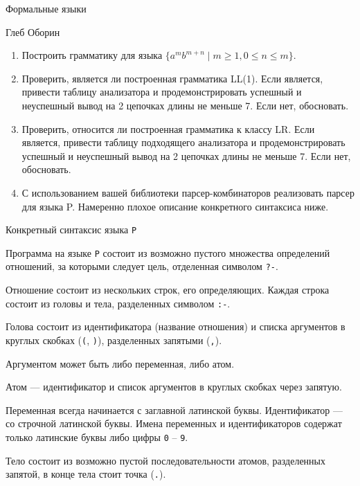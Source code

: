 \documentclass[12pt]{article}
\begin{document}
\begin{center}
{\LARGE Формальные языки}

\bigskip

{\Large Глеб Оборин}
\end{center} 

\bigskip

\begin{enumerate}
  \item Построить грамматику для языка $\{ a^m b^{m+n} \mid m \geq 1, 0 \leq n \leq m \}$.
  
  \item Проверить, является ли построенная грамматика LL(1). Если является, привести таблицу анализатора и продемонстрировать успешный и неуспешный вывод на 2 цепочках длины не меньше 7. Если нет, обосновать. 
  \item Проверить, относится ли построенная грамматика к классу LR. Если является, привести таблицу подходящего анализатора и продемонстрировать успешный и неуспешный вывод на 2 цепочках длины не меньше 7. Если нет, обосновать.
  \item С использованием вашей библиотеки парсер-комбинаторов реализовать парсер для языка P. Намеренно плохое описание конкретного синтаксиса ниже.
\end{enumerate}

\begin{center}
    \Large{Конкретный синтаксис языка \verb!P!}
\end{center}

Программа на языке \verb!P! состоит из возможно пустого множества определений отношений, за которыми следует цель, отделенная символом \verb!?-!.

Отношение состоит из нескольких строк, его определяющих. 
Каждая строка состоит из головы и тела, разделенных символом \verb!:-!. 

Голова состоит из идентификатора (название отношения) и списка аргументов в круглых скобках (\verb!(!, \verb!)!), разделенных запятыми (\verb!,!). 

Аргументом может быть либо переменная, либо атом. 

Атом --- идентификатор и список аргументов в круглых скобках через запятую. 

Переменная всегда начинается с заглавной латинской буквы. Идентификатор --- со строчной латинской буквы.
Имена переменных и идентификаторов содержат только латинские буквы либо цифры \verb!0! -- \verb!9!.

Тело состоит из возможно пустой последовательности атомов, разделенных запятой, в конце тела стоит точка (\verb!.!).
\end{document}
